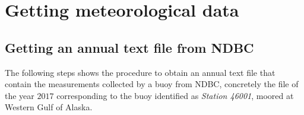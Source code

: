 
\chapter{Getting meteorological data}\label{app:GettingMetData}

	\begin{onehalfspace}
	
		
		\section{Getting an annual text file from NDBC}

			The following steps shows the procedure to obtain an annual text file that contain the measurements collected by a buoy from NDBC, concretely the file of the year $2017$ corresponding to the buoy identified as \textit{Station 46001}, moored at Western Gulf of Alaska.
			

\end{onehalfspace}
